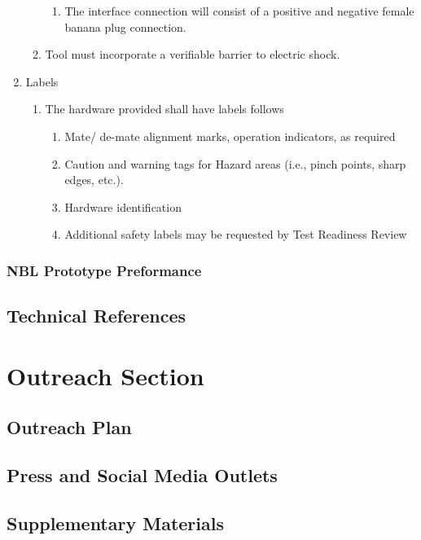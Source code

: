 \documentclass{article}
\begin{document}
\begin{enumerate}
\begin{enumerate}
\begin{enumerate}
            \item The interface connection will consist of a positive and negative female banana plug connection.
        \end{enumerate}
        \item Tool must incorporate a verifiable barrier to electric shock.
    \end{enumerate}
    \item Labels
    \begin{enumerate}
        \item The hardware provided shall have labels follows
        \begin{enumerate}
            \item Mate/ de-mate alignment marks, operation indicators, as required
            \item Caution and warning tags for Hazard areas (i.e., pinch points, sharp edges, etc.).
            \item Hardware identification
            \item Additional safety labels may be requested by Test Readiness Review
        \end{enumerate}
    \end{enumerate}
\end{enumerate}
\subsubsection{NBL Prototype Preformance}
\subsection{Technical References}


\section{Outreach Section}
\subsection{Outreach Plan}
\subsection{Press and Social Media Outlets}
\subsection{Supplementary Materials}
\end{document}
